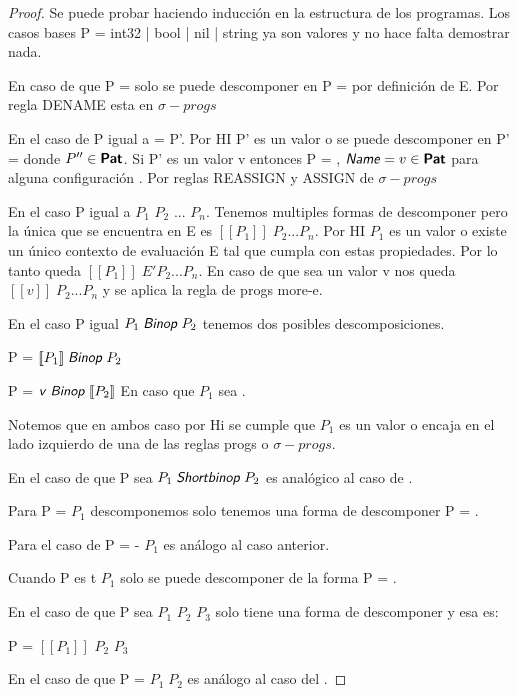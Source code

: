 \begin{proof}
Se puede probar haciendo inducción en la estructura de los programas.
Los casos bases P = int32 | bool | nil | string ya son valores y no hace falta demostrar nada.

En caso de que P =  solo se puede descomponer en P =  por definición de E. Por regla DENAME esta en $\sigma-progs$

En el caso de P igual a  = P'.
Por HI P' es un valor o se puede descomponer en P' = 
donde $P'' \in \textsf{\textbf{Pat}}$.
Si P' es un valor v entonces P = , $\textsf{\textit{Name}} = v \in \textsf{\textbf{Pat}}$ para alguna configuración .
Por reglas REASSIGN y ASSIGN de $\sigma-progs$

En el caso P igual a $P_{1}$ $P_{2}$ ... $P_{n}$. Tenemos multiples formas de descomponer pero la única que se encuentra en E es
$[\![P_{1}]\!] \; P_{2} ... P_{n}$. Por HI $P_{1}$ es un valor o existe un único contexto de evaluación E tal que cumpla con estas propiedades.
Por lo tanto queda $[\![P_{1}]\!] \; E' P_{2} ... P_{n}$. En caso de que sea un valor v nos queda $[\![v]\!] \; P_{2} ... P_{n}$ y se aplica la regla de progs more-e.

En el caso P igual $P_{1} \; \textsf{\textit{Binop}} \; P_{2}$ tenemos dos posibles descomposiciones.

P = $[\![P_{1}]\!] \; \textsf{\textit{Binop}} \; P_{2}$ 

P = $\textsf{\textit{v}} \; \textsf{\textit{Binop}} \; [\![P_{2}]\!]$ En caso que $P_{1}$ sea .

Notemos que en ambos caso por Hi se cumple que $P_{1}$ es un valor o encaja en el lado izquierdo de una de las reglas progs o $\sigma-progs$.

En el caso de que P sea $P_{1} \; \textsf{\textit{Shortbinop}} \; P_{2}$ es analógico al caso de .

Para P =  $P_{1}$ descomponemos solo tenemos una forma de descomponer P = .

Para el caso de P = - $P_{1}$ es análogo al caso anterior.

Cuando P es  t $P_{1}$ solo se puede descomponer de la forma P = .

En el caso de que P sea  $P_{1}$  $P_{2}$  $P_{3}$ solo tiene una forma de descomponer y esa es:

P =  $[\![P_{1}]\!]$  $P_{2}$  $P_{3}$

En el caso de que P =  $P_{1} \; P_{2}$ es análogo al caso del .




\end{proof}
